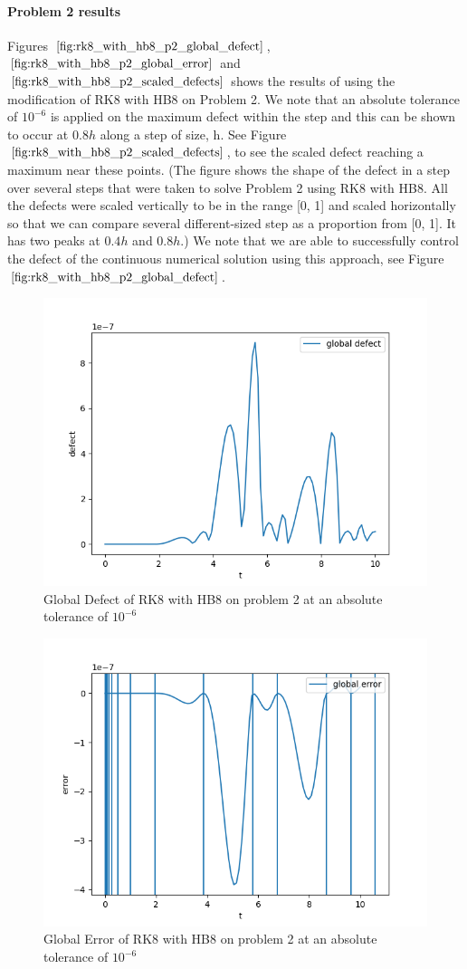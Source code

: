 \documentclass{article}
\begin{document}
\paragraph{Problem 2 results}
Figures $\ref{fig:rk8_with_hb8_p2_global_defect}$, $\ref{fig:rk8_with_hb8_p2_global_error}$ and $\ref{fig:rk8_with_hb8_p2_scaled_defects}$ shows the results of using the modification of RK8 with HB8 on Problem 2. We note that an absolute tolerance of $10^{-6}$ is applied on the maximum defect within the step and this can be shown to occur at $0.8h$ along a step of size, h. See Figure $\ref{fig:rk8_with_hb8_p2_scaled_defects}$, to see the scaled defect reaching a maximum near these points. (The figure shows the shape of the defect in a step over several steps that were taken to solve Problem 2 using RK8 with HB8. All the defects were scaled vertically to be in the range [0, 1] and scaled horizontally so that we can compare several different-sized step as a proportion from [0, 1]. It has two peaks at $0.4h$ and $0.8h$.) We note that we are able to successfully control the defect of the continuous numerical solution using this approach, see Figure $\ref{fig:rk8_with_hb8_p2_global_defect}$. 

\begin{figure}[H]
\centering
\includegraphics[width=0.7\linewidth]{./figures/rk8_with_hb8_p2_global_defect}
\caption{Global Defect of RK8 with HB8 on problem 2 at an absolute tolerance of $10^{-6}$}
\label{fig:rk8_with_hb8_p2_global_defect}
\end{figure}

\begin{figure}[H]
\centering
\includegraphics[width=0.7\linewidth]{./figures/rk8_with_hb8_p2_global_error}
\caption{Global Error of RK8 with HB8 on problem 2 at an absolute tolerance of $10^{-6}$}
\label{fig:rk8_with_hb8_p2_global_error}
\end{figure}
\end{document}
